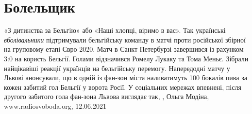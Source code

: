  
 
 
 
 
\chapter{Болельщик}

«З дитинства за Бельгію» або «Наші хлопці, віримо в вас». Так українські
\emph{вболівальники} підтримували бельгійську команду в матчі проти російської
збірної на груповому етапі Євро-2020. Матч в Санкт-Петербурзі завершився із
рахунком 3:0 на користь Бельгії. Голами відзначився Ромелу Лукаку та Тома
Меньє. Зібрали найцікавіші реакції українців на бельгійську перемогу.
Напередодні матчу у Львові анонсували, що в одній із фан-зон міста наливатимуть
100 бокалів пива за кожен забитий гол Бельгії у ворота Росії. У соціальних
мережах впевнені, після другого забитого гола фан-зона Львова виглядає так,
, Ольга Модіна, www.radiosvoboda.org, 12.06.2021

